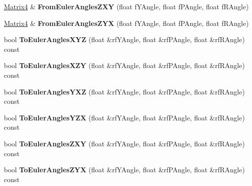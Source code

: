 \begin{DoxyCompactItemize}
\item 
\hyperlink{class_magnum_1_1_matrix4}{Matrix4} \& {\bfseries From\+Euler\+Angles\+Z\+XY} (float f\+Y\+Angle, float f\+P\+Angle, float f\+R\+Angle)\hypertarget{class_magnum_1_1_matrix4_abf22c094184a056bdf83c85238cd429a}{}\label{class_magnum_1_1_matrix4_abf22c094184a056bdf83c85238cd429a}

\item 
\hyperlink{class_magnum_1_1_matrix4}{Matrix4} \& {\bfseries From\+Euler\+Angles\+Z\+YX} (float f\+Y\+Angle, float f\+P\+Angle, float f\+R\+Angle)\hypertarget{class_magnum_1_1_matrix4_a07090401f6c515b925399c259b71183b}{}\label{class_magnum_1_1_matrix4_a07090401f6c515b925399c259b71183b}

\item 
bool {\bfseries To\+Euler\+Angles\+X\+YZ} (float \&rf\+Y\+Angle, float \&rf\+P\+Angle, float \&rf\+R\+Angle) const \hypertarget{class_magnum_1_1_matrix4_ac5f051b68d33eb88c7657c5525089962}{}\label{class_magnum_1_1_matrix4_ac5f051b68d33eb88c7657c5525089962}

\item 
bool {\bfseries To\+Euler\+Angles\+X\+ZY} (float \&rf\+Y\+Angle, float \&rf\+P\+Angle, float \&rf\+R\+Angle) const \hypertarget{class_magnum_1_1_matrix4_a52358a67ff4c6a29d705a6c51aa125e1}{}\label{class_magnum_1_1_matrix4_a52358a67ff4c6a29d705a6c51aa125e1}

\item 
bool {\bfseries To\+Euler\+Angles\+Y\+XZ} (float \&rf\+Y\+Angle, float \&rf\+P\+Angle, float \&rf\+R\+Angle) const \hypertarget{class_magnum_1_1_matrix4_aa420cd2a91484f166562ad207889d320}{}\label{class_magnum_1_1_matrix4_aa420cd2a91484f166562ad207889d320}

\item 
bool {\bfseries To\+Euler\+Angles\+Y\+ZX} (float \&rf\+Y\+Angle, float \&rf\+P\+Angle, float \&rf\+R\+Angle) const \hypertarget{class_magnum_1_1_matrix4_aed734e6432be26a67eeed45f7719bc3c}{}\label{class_magnum_1_1_matrix4_aed734e6432be26a67eeed45f7719bc3c}

\item 
bool {\bfseries To\+Euler\+Angles\+Z\+XY} (float \&rf\+Y\+Angle, float \&rf\+P\+Angle, float \&rf\+R\+Angle) const \hypertarget{class_magnum_1_1_matrix4_ac2e7d3aaf03386a1d659728a5452a09b}{}\label{class_magnum_1_1_matrix4_ac2e7d3aaf03386a1d659728a5452a09b}

\item 
bool {\bfseries To\+Euler\+Angles\+Z\+YX} (float \&rf\+Y\+Angle, float \&rf\+P\+Angle, float \&rf\+R\+Angle) const \hypertarget{class_magnum_1_1_matrix4_aba5b2e72ed288640b742bb015811df87}{}\label{class_magnum_1_1_matrix4_aba5b2e72ed288640b742bb015811df87}


\end{DoxyCompactItemize}
